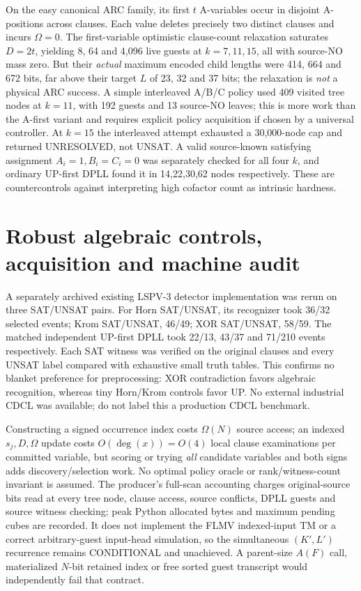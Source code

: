 \documentclass[10pt]{article}
\begin{document}
On the easy canonical ARC family, its first $t$ A-variables occur in disjoint A-positions across clauses. Each value deletes precisely two distinct clauses and incurs $\Omega=0$. The first-variable optimistic clause-count relaxation saturates $D=2t$, yielding 8, 64 and 4,096 live guests at $k=7,11,15$, all with source-NO mass zero. But their \emph{actual} maximum encoded child lengths were 414, 664 and 672 bits, far above their target $L$ of 23, 32 and 37 bits; the relaxation is \emph{not} a physical ARC success. A simple interleaved A/B/C policy used 409 visited tree nodes at $k=11$, with 192 guests and 13 source-NO leaves; this is more work than the A-first variant and requires explicit policy acquisition if chosen by a universal controller. At $k=15$ the interleaved attempt exhausted a 30,000-node cap and returned UNRESOLVED, not UNSAT. A valid source-known satisfying assignment $A_i=1,B_i=C_i=0$ was separately checked for all four $k$, and ordinary UP-first DPLL found it in 14,22,30,62 nodes respectively. These are countercontrols against interpreting high cofactor count as intrinsic hardness.

\section{Robust algebraic controls, acquisition and machine audit}
A separately archived existing LSPV-3 detector implementation was rerun on three SAT/UNSAT pairs. For Horn SAT/UNSAT, its recognizer took 36/32 selected events; Krom SAT/UNSAT, 46/49; XOR SAT/UNSAT, 58/59. The matched independent UP-first DPLL took 22/13, 43/37 and 71/210 events respectively. Each SAT witness was verified on the original clauses and every UNSAT label compared with exhaustive small truth tables. This confirms no blanket preference for preprocessing: XOR contradiction favors algebraic recognition, whereas tiny Horn/Krom controls favor UP. No external industrial CDCL was available; do not label this a production CDCL benchmark.

Constructing a signed occurrence index costs $\Omega(N)$ source access; an indexed $s_j,D,\Omega$ update costs $O(\deg(x))=O(4)$ local clause examinations per committed variable, but scoring or trying \emph{all} candidate variables and both signs adds discovery/selection work. No optimal policy oracle or rank/witness-count invariant is assumed. The producer's full-scan accounting charges original-source bits read at every tree node, clause access, source conflicts, DPLL guests and source witness checking; peak Python allocated bytes and maximum pending cubes are recorded. It does not implement the FLMV indexed-input TM or a correct arbitrary-guest input-head simulation, so the simultaneous $(K',L')$ recurrence remains CONDITIONAL and unachieved. A parent-size $A(F)$ call, materialized $N$-bit retained index or free sorted guest transcript would independently fail that contract.
\end{document}

